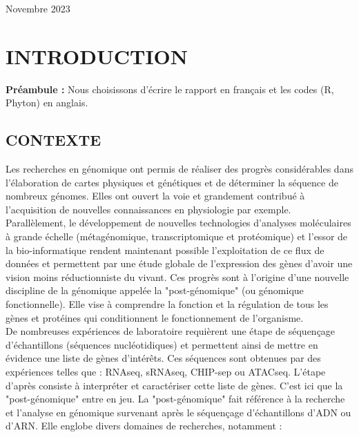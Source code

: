 \documentclass[a4paper,11pt,openright]{report}
\begin{document}
\begin{titlepage}
\begin{center}
\vfill
{\large Novembre 2023}

\end{center}
\end{titlepage}




\newpage
\pagestyle{empty}
\tableofcontents




\chapter{INTRODUCTION}
\thispagestyle{empty}
\clearpage
\newpage
\setcounter{page}{1} %
\pagestyle{fancy}

\textbf{Préambule :} Nous choisissons d'écrire le rapport en français et les codes (R, Phyton) en anglais.

	\section{CONTEXTE}
Les recherches en génomique ont permis de réaliser des progrès considérables dans l’élaboration de cartes physiques et
génétiques et de déterminer la séquence de nombreux génomes. Elles ont ouvert la voie et grandement contribué à l’acquisition de nouvelles connaissances en physiologie par exemple. Parallèlement, le développement de nouvelles technologies d’analyses moléculaires à grande échelle (métagénomique, transcriptomique et protéomique) et l’essor de la bio-informatique rendent maintenant possible l’exploitation de ce flux de données et permettent par une étude globale de l’expression des gènes d’avoir
une vision moins réductionniste du vivant. Ces progrès sont à l’origine d’une nouvelle discipline de la génomique appelée la "post-génomique" (ou génomique fonctionnelle).  Elle vise à comprendre la fonction et la régulation de tous les gènes et protéines qui conditionnent le fonctionnement de l’organisme.\\
De nombreuses expériences de laboratoire requièrent une étape de séquençage d'échantillons (séquences nucléotidiques) et permettent ainsi de mettre en évidence une liste de gènes d'intérêts. Ces séquences sont obtenues par des expériences telles que : RNAseq, sRNAseq, CHIP-sep ou ATACseq.  L'étape d'après consiste  à interpréter et caractériser cette liste de gènes. C'est ici que la "post-génomique" entre en jeu. La "post-génomique" fait référence à la recherche et l'analyse en génomique survenant après le séquençage d'échantillons d'ADN ou d'ARN. Elle englobe divers domaines de recherches, notamment :
\end{document}
